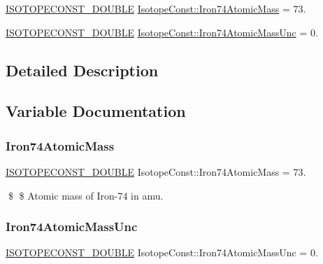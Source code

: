 \begin{DoxyCompactItemize}
\item 
\mbox{\hyperlink{group___isotope_const-_macros_ga8f45a7272ce02c0b4c65c44636ed719a}{I\+S\+O\+T\+O\+P\+E\+C\+O\+N\+S\+T\+\_\+\+D\+O\+U\+B\+LE}} \mbox{\hyperlink{group___isotope_const-_iron-_fe74_ga13b439fe5c60b2a6d9d1f781a72ad3e5}{Isotope\+Const\+::\+Iron74\+Atomic\+Mass}} = 73.
\item 
\mbox{\hyperlink{group___isotope_const-_macros_ga8f45a7272ce02c0b4c65c44636ed719a}{I\+S\+O\+T\+O\+P\+E\+C\+O\+N\+S\+T\+\_\+\+D\+O\+U\+B\+LE}} \mbox{\hyperlink{group___isotope_const-_iron-_fe74_gaa07212c28e66ed9affcc468753618d6a}{Isotope\+Const\+::\+Iron74\+Atomic\+Mass\+Unc}} = 0.
\end{DoxyCompactItemize}


\subsection{Detailed Description}


\subsection{Variable Documentation}
\mbox{\label{group___isotope_const-_iron-_fe74_ga13b439fe5c60b2a6d9d1f781a72ad3e5}} 
\subsubsection{\texorpdfstring{Iron74\+Atomic\+Mass}{Iron74AtomicMass}}
{\footnotesize\ttfamily \mbox{\hyperlink{group___isotope_const-_macros_ga8f45a7272ce02c0b4c65c44636ed719a}{I\+S\+O\+T\+O\+P\+E\+C\+O\+N\+S\+T\+\_\+\+D\+O\+U\+B\+LE}} Isotope\+Const\+::\+Iron74\+Atomic\+Mass = 73.}

\$ \$ Atomic mass of Iron-\/74 in amu. \mbox{\label{group___isotope_const-_iron-_fe74_gaa07212c28e66ed9affcc468753618d6a}} 
\subsubsection{\texorpdfstring{Iron74\+Atomic\+Mass\+Unc}{Iron74AtomicMassUnc}}
{\footnotesize\ttfamily \mbox{\hyperlink{group___isotope_const-_macros_ga8f45a7272ce02c0b4c65c44636ed719a}{I\+S\+O\+T\+O\+P\+E\+C\+O\+N\+S\+T\+\_\+\+D\+O\+U\+B\+LE}} Isotope\+Const\+::\+Iron74\+Atomic\+Mass\+Unc = 0.}

